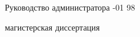 \begin{titlepage}
    \vspace{1.2em}                                                        
                                                                                        
    \begin{center}                                                        
    \Large Руководство администратора -01 98                                                                  
    \end{center}                                                          
                                                                                        
    \vspace{5em}                                                          
                                                                                        
    \begin{center}                                                        
     магистерская диссертация                                                           
     \end{center}                                                         
    \vspace{6em}                                                          
                                                                                        
                                                                                        

\end{titlepage}

